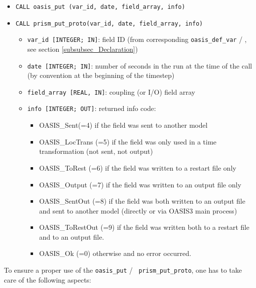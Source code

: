 \begin{itemize} 
\item {\tt CALL oasis\_put       (var\_id, date, field\_array, info)}
\item {\tt CALL prism\_put\_proto(var\_id, date, field\_array, info)}
\begin{itemize}
\item {\tt var\_id [INTEGER; IN]}: field ID (from
  corresponding {\tt oasis\_def\_var} / ,
  see section \ref{subsubsec_Declaration})
\item {\tt date [INTEGER; IN]}: number of seconds in the run at the
time of the call (by convention at the beginning of the timestep)
\item {\tt field\_array [REAL, IN]}: coupling (or I/O) field array 
\item {\tt info [INTEGER; OUT]}: returned info code:
   \begin{itemize} 
      \item OASIS\_Sent(=4) if the field was sent to another model 
      \item OASIS\_LocTrans (=5) if the field was only used in a time
       transformation (not sent, not output)
      \item OASIS\_ToRest (=6) if the field was written to a restart file only
      \item OASIS\_Output (=7) if the field was written to an output file only
      \item OASIS\_SentOut (=8) if the field was both written to an output file
       and sent to another model (directly or via OASIS3 main process)
      \item OASIS\_ToRestOut (=9) if the field was written both to a
       restart file and to an output file.
      \item OASIS\_Ok (=0) otherwise and no error occurred.
   \end{itemize}
\end{itemize}
\end{itemize}

To ensure a proper use of the {\tt oasis\_put} / {\tt
  prism\_put\_proto}, one has to take care of the following aspects:

